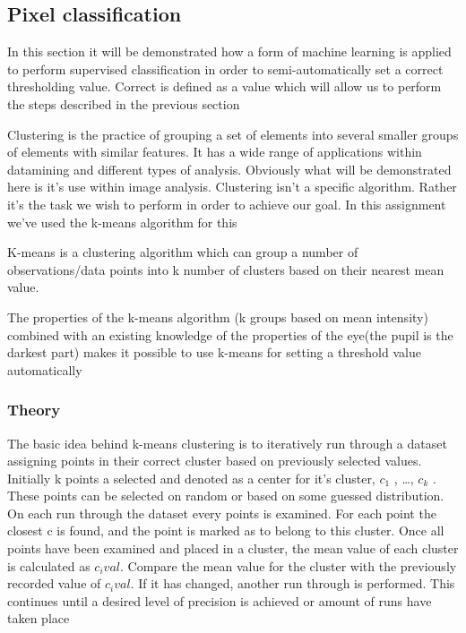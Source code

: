 \subsection{Pixel classification}

In this section it will be demonstrated how a form of machine learning
is applied to perform supervised classification in order to
semi-automatically set a correct thresholding value. Correct is defined
as a value which will allow us to perform the steps described in the
previous section

Clustering is the practice of grouping a set of elements into several
smaller groups of elements with similar features. It has a wide range of
applications within datamining and different types of analysis.
Obviously what will be demonstrated here is it's use within image
analysis. Clustering isn't a specific algorithm. Rather it's the task we
wish to perform in order to achieve our goal. In this assignment we've
used the k-means algorithm for this

K-means is a clustering algorithm which can group a number of
observations/data points into k number of clusters based on their
nearest mean value.

The properties of the k-means algorithm (k groups based on mean
intensity) combined with an existing knowledge of the properties of the
eye(the pupil is the darkest part) makes it possible to use k-means for
setting a threshold value automatically

\subsubsection{Theory}

The basic idea behind k-means clustering is to iteratively run through a
dataset assigning points in their correct cluster based on previously
selected values. Initially k points a selected and denoted as a center
for it's cluster, $c_1$ , \ldots{}, $c_k$ . These points can be selected
on random or based on some guessed distribution. On each run through the
dataset every points is examined. For each point the closest c is found,
and the point is marked as to belong to this cluster. Once all points
have been examined and placed in a cluster, the mean value of each
cluster is calculated as $c_ival$. Compare the mean value for the
cluster with the previously recorded value of $c_ival$. If it has
changed, another run through is performed. This continues until a
desired level of precision is achieved or amount of runs have taken
place

